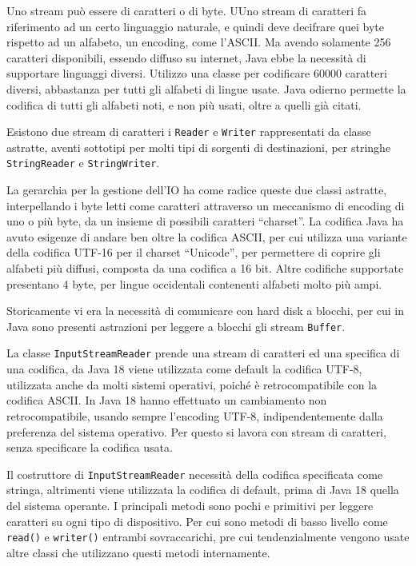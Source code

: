 \documentclass{article}
\numberwithin{equation}{subsection}
\begin{document}
Uno stream può essere di caratteri o di byte. UUno stream di caratteri fa riferimento ad un certo linguaggio naturale, e quindi deve decifrare quei byte rispetto ad un alfabeto, 
un encoding, come l'ASCII. Ma avendo solamente 256 caratteri disponibili, essendo diffuso su internet, Java ebbe la necessità di supportare linguaggi diversi. Utilizzo una classe 
per codificare 60000 caratteri diversi, abbastanza per tutti gli alfabeti di lingue usate. Java odierno permette la codifica di tutti gli alfabeti noti, e non più usati, oltre 
a quelli già citati. 

Esistono due stream di caratteri i \verb|Reader| e \verb|Writer| rappresentati da classe astratte, aventi sottotipi per molti tipi di sorgenti di destinazioni, per stringhe 
\verb|StringReader| e \verb|StringWriter|. 

La gerarchia per la gestione dell'IO ha come radice queste due classi astratte, interpellando i byte letti come caratteri attraverso un meccanismo di encoding di uno o più byte, 
da un insieme di possibili caratteri ``charset''. 
La codifica Java ha avuto esigenze di andare ben oltre la codifica ASCII, per cui utilizza una variante della codifica UTF-16 per il charset ``Unicode'', per permettere di 
coprire gli alfabeti più diffusi, composta da una codifica a 16 bit. 
Altre codifiche supportate presentano 4 byte, per lingue occidentali contenenti alfabeti molto più ampi. 


Storicamente vi era la necessità di comunicare con hard disk a blocchi, per cui in Java sono presenti astrazioni per leggere a blocchi gli stream \verb|Buffer|. 

La classe \verb|InputStreamReader| prende una stream di caratteri ed una specifica di una codifica, da Java 18 viene utilizzata come default la codifica UTF-8, utilizzata 
anche da molti sistemi operativi, poiché è retrocompatibile con la codifica ASCII. In Java 18 hanno effettuato un cambiamento non retrocompatibile, usando sempre l'encoding 
UTF-8, indipendentemente dalla preferenza del sistema operativo. Per questo si lavora con stream di caratteri, senza specificare la codifica usata. 

Il costruttore di \verb|InputStreamReader| necessità della codifica specificata come stringa, altrimenti viene utilizzata la codifica di default, prima di Java 18 quella del sistema 
operante. 
I principali metodi sono pochi e primitivi per leggere caratteri su ogni tipo di dispositivo. Per cui sono metodi di basso livello come \verb|read()| e \verb|writer()| 
entrambi sovraccarichi, pre cui tendenzialmente vengono usate altre classi che utilizzano questi metodi internamente. 
\end{document}
